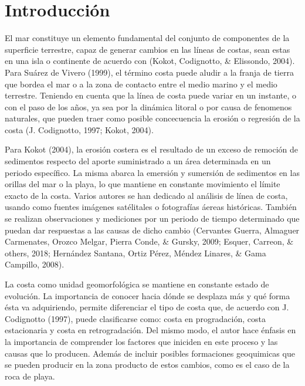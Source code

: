 \documentclass[11pt,]{article}
\begin{document}
\vskip 6.5pt


\noindent  \section{Introducción}\label{introducciuxf3n}

El mar constituye un elemento fundamental del conjunto de componentes de
la superficie terrestre, capaz de generar cambios en las líneas de
costas, sean estas en una isla o continente de acuerdo con (Kokot,
Codignotto, \& Elissondo, 2004). Para Suárez de Vivero (1999), el
término costa puede aludir a la franja de tierra que bordea el mar o a
la zona de contacto entre el medio marino y el medio terrestre. Teniendo
en cuenta que la línea de costa puede variar en un instante, o con el
paso de los años, ya sea por la dinámica litoral o por causa de
fenomenos naturales, que pueden traer como posible concecuencia la
erosión o regresión de la costa (J. Codignotto, 1997; Kokot, 2004).

Para Kokot (2004), la erosión costera es el resultado de un exceso de
remoción de sedimentos respecto del aporte suministrado a un área
determinada en un periodo específico. La misma abarca la emersión y
sumersión de sedimentos en las orillas del mar o la playa, lo que
mantiene en constante movimiento el límite exacto de la costa. Varios
autores se han dedicado al análisis de línea de costa, usando como
fuentes imágenes satélitales o fotografías áereas históricas. También se
realizan observaciones y mediciones por un periodo de tiempo determinado
que puedan dar respuestas a las causas de dicho cambio (Cervantes
Guerra, Almaguer Carmenates, Orozco Melgar, Pierra Conde, \& Gursky,
2009; Esquer, Carreon, \& others, 2018; Hernández Santana, Ortiz Pérez,
Méndez Linares, \& Gama Campillo, 2008).

La costa como unidad geomorfológica se mantiene en constante estado de
evolución. La importancia de conocer hacia dónde se desplaza más y qué
forma ésta va adquiriendo, permite diferenciar el tipo de costa que, de
acuerdo con J. Codignotto (1997), puede clasificarse como: costa en
progradación, costa estacionaria y costa en retrogradación. Del mismo
modo, el autor hace énfasis en la importancia de comprender los factores
que iniciden en este proceso y las causas que lo producen. Además de
incluir posibles formaciones geoquimicas que se pueden producir en la
zona producto de estos cambios, como es el caso de la roca de playa.
\end{document}
